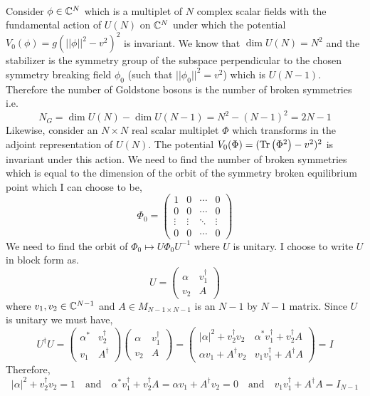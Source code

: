 \documentclass[12pt]{article}
\begin{document}
\bigskip\\
Consider $\phi \in \mathbb{C}^N$ which is a multiplet of $N$ complex scalar fields with the fundamental action of $U(N)$ on $\mathbb{C}^N$ under which the potential $V_0(\phi) = g(||\phi||^2 - v^2)^2$ is invariant. We know that $\dim{U(N)} = N^2$ and the stabilizer is the symmetry group of the subspace perpendicular to the chosen symmetry breaking field $\phi_0$ (such that $||\phi_0||^2 = v^2$) which is $U(N-1)$. Therefore the number of Goldstone bosons is the number of broken symmetries i.e.
\[ N_G = \dim{U(N)} - \dim{U(N-1)} = N^2 - (N-1)^2 = 2 N - 1 \]
Likewise, consider an $N \times N$ real scalar multiplet $\Phi$ which transforms in the adjoint representation of $U(N)$. The potential $V_0(\Phi) = (\mathrm{Tr}\left( \Phi^2 \right) - v^2)^2$ is invariant under this action. We need to find the number of broken symmetries which is equal to the dimension of the orbit of the symmetry broken equilibrium point which I can choose to be,
\[ 
\Phi_0
= 
\begin{pmatrix}
1 & 0 & \cdots & 0
\\
0 & 0 & \cdots & 0
\\
\vdots & \vdots & \ddots & \vdots
\\
0 & 0 & \cdots & 0
\end{pmatrix}
\]
We need to find the orbit of $\Phi_0 \mapsto U \Phi_0 U^{-1}$ where $U$ is unitary. 
I choose to write $U$ in block form as.
\[  U =
\begin{pmatrix}
\alpha & v_1^\dagger
\\
v_2 & A 
\end{pmatrix}
\]
where $v_1, v_2 \in \mathbb{C}^{N-1}$ and $A \in M_{N-1 \times N-1}$ is an $N-1$ by $N-1$ matrix. Since $U$ is unitary we must have,
\[ U^\dagger U =
\begin{pmatrix}
\alpha^* & v_2^\dagger 
\\
v_1 & A^\dagger
\end{pmatrix}
\begin{pmatrix}
\alpha & v_1^\dagger 
\\
v_2 & A
\end{pmatrix}
= 
\begin{pmatrix}
|\alpha|^2 + v_2^\dagger v_2 & \alpha^* v_1^\dagger + v_2^\dagger A 
\\
\alpha v_1 + A^\dagger v_2 & v_1 v_1^\dagger + A^\dagger A
\end{pmatrix} 
= I \]
Therefore,
\[ |\alpha|^2 + v_2^\dagger v_2 = 1 \quad \text{and} \quad \alpha^* v_1^\dagger + v_2^\dagger A = \alpha v_1 + A^\dagger v_2 = 0 \quad \text{and} \quad v_1 v_1^\dagger + A^\dagger A = I_{N-1} \]
\end{document}
